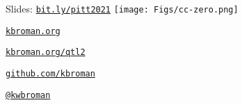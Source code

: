 \documentclass[12pt,t]{beamer}
\begin{document}
\begin{frame}[c]{}

\Large

Slides: \href{https://bit.ly/pitt2021}{\tt bit.ly/pitt2021} \quad
\texttt{[image: Figs/cc-zero.png]}

\vspace{7mm}

\href{https://kbroman.org}{\tt \lolit kbroman.org}

\vspace{7mm}

\href{https://kbroman.org/qtl2}{\tt kbroman.org/qtl2}

\vspace{7mm}

\href{https://github.com/kbroman}{\tt \lolit github.com/kbroman}

\vspace{7mm}

\href{https://twitter.com/kwbroman}{\tt \lolit @kwbroman}


\end{frame}
\end{document}
